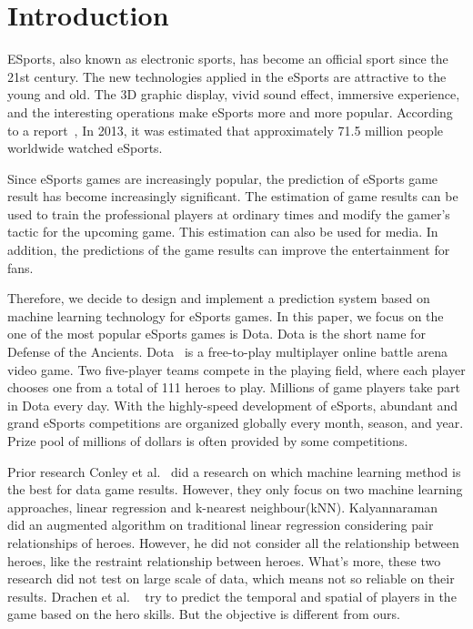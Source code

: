 \section{Introduction}

ESports, also known as electronic sports, has become an official sport since the 21st century.
The new technologies applied in the eSports are attractive to the young and old.
The 3D graphic display, vivid sound effect, immersive experience, and the interesting operations make eSports more and more popular.
According to a report~\cite{esports}, In 2013, it was estimated that approximately 71.5 million people worldwide watched eSports.

Since eSports games are increasingly popular, the prediction of eSports game result has become increasingly significant.
The estimation of game results can be used to train the professional players at ordinary times and modify the gamer’s tactic for the upcoming game.
This estimation can also be used for media.
In addition, the predictions of the game results can improve the entertainment for fans.

Therefore, we decide to design and implement a prediction system based on machine learning technology for eSports games.
In this paper, we focus on the one of the most popular eSports games is Dota.
Dota is the short name for Defense of the Ancients.
Dota~\cite{dotablog} is a free-to-play multiplayer online battle arena video game.
Two five-player teams compete in the playing field, where each player chooses one from a total of 111 heroes to play.
Millions of game players take part in Dota every day.
With the highly-speed development of eSports, abundant and grand eSports competitions are organized globally every month, season, and year.
Prize pool of millions of dollars is often provided by some competitions.

Prior research 
Conley et al.~\cite{conley2013does} did a research on which machine learning method is the best for data game results.
However, they only focus on two machine learning approaches, linear regression and k-nearest neighbour(kNN).
Kalyannaraman~\cite{kau2013win} did an augmented algorithm on traditional linear regression considering pair relationships of heroes.
However, he did not consider all the relationship between heroes, like the restraint relationship between heroes.
What's more, these two research did not test on large scale of data, which means not so reliable on their results.
Drachen et al. ~\cite{drachen2014skill} try to predict the temporal and spatial of players in the game based on the hero skills.
But the objective is different from ours. 

